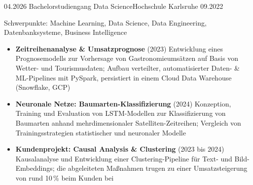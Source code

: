 
\begin{experiences}
  \experience
    {04.2026}   {Bachelorstudiengang Data Science}{Hochschule Karlsruhe}{}
    {09.2022}   {Schwerpunkte: Machine Learning, Data Science, Data Engineering, Datenbanksysteme, Business Intelligence
                  \begin{itemize}
                    \item \textbf{Zeitreihenanalyse \& Umsatzprognose} (2023)
                    Entwicklung eines Prognosemodells zur Vorhersage von Gastronomieumsätzen auf Basis von Wetter- und Tourismusdaten; Aufbau verteilter, automatisierter Daten- \& ML-Pipelines mit PySpark, persistiert in einem Cloud Data Warehouse (Snowflake, GCP)

                    \item \textbf{Neuronale Netze: Baumarten-Klassifizierung} (2024)
                    Konzeption, Training und Evaluation von LSTM-Modellen zur Klassifizierung von Baumarten anhand mehrdimensionaler Satelliten-Zeitreihen; Vergleich von Trainingsstrategien statistischer und neuronaler Modelle
                    {}

                    \item \textbf{Kundenprojekt: Causal Analysis \& Clustering} (2023 bis 2024)
                    Kausalanalyse und Entwicklung einer Clustering-Pipeline für Text- und Bild-Embeddings; die abgeleiteten Maßnahmen trugen zu einer Umsatzsteigerung von rund 10\,\% beim Kunden bei
                    {}
                  \end{itemize}
                }
                {}
  \emptySeparator
\end{experiences}